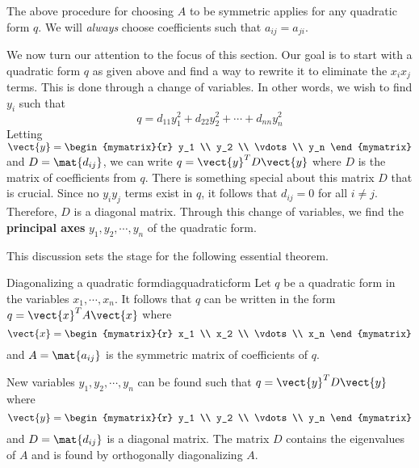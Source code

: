 The above procedure for choosing $A$ to be symmetric applies for any quadratic form $q$. We will \textit{always} choose coefficients such that $a_{ij}=a_{ji}$. 

We now turn our attention to the focus of this section. Our goal is to start with a quadratic form $q$ as given above and find a way to rewrite it to eliminate the $x_ix_j$ terms. This is done through a change of variables. In other words, we wish to find $y_i$ such that 
\[
q = d_{11}y_1^2 + d_{22}y_2^2 + \cdots + d_{nn}y_n^2
\]
 Letting $\vect{y} = \begin{mymatrix}{r}
y_1 \\
y_2 \\
\vdots \\
y_n
\end{mymatrix}$ and $D = \mat{d_{ij} }$, we can write $q = \vect{y}^T D \vect{y}$ where $D$ is the matrix of coefficients from $q$. There is something special about this matrix $D$ that is crucial. Since no $y_iy_j$ terms exist in $q$, it follows that $d_{ij} = 0$ for all $i \neq j$. Therefore, $D$ is a diagonal matrix. Through this change of variables, we find the \textbf{principal axes} $y_1, y_2, \cdots, y_n$ of the quadratic form. 

This discussion sets the stage for the following essential theorem.

\begin{theorem}{Diagonalizing a quadratic form}{diagquadraticform}
Let $q$ be a quadratic form in the variables $x_1, \cdots, x_n$. It follows that $q$ can be written in the form $q = \vect{x}^T A \vect{x}$ where 
\[
\vect{x} = \begin{mymatrix}{r}
x_1 \\
x_2 \\
\vdots \\
x_n
\end{mymatrix} 
\]
and $A = \mat{a_{ij} }$ is the symmetric matrix of coefficients of $q$. 

New variables $y_1, y_2, \cdots, y_n$ can be found such that $q = \vect{y}^T D \vect{y}$ where 
\[
\vect{y} = \begin{mymatrix}{r} 
y_1 \\
y_2 \\
\vdots \\
y_n
\end{mymatrix} \] and $D=\mat{d_{ij} }$ is a diagonal matrix. The matrix $D$ contains the eigenvalues of $A$ and is found by orthogonally diagonalizing $A$. 
\end{theorem}

